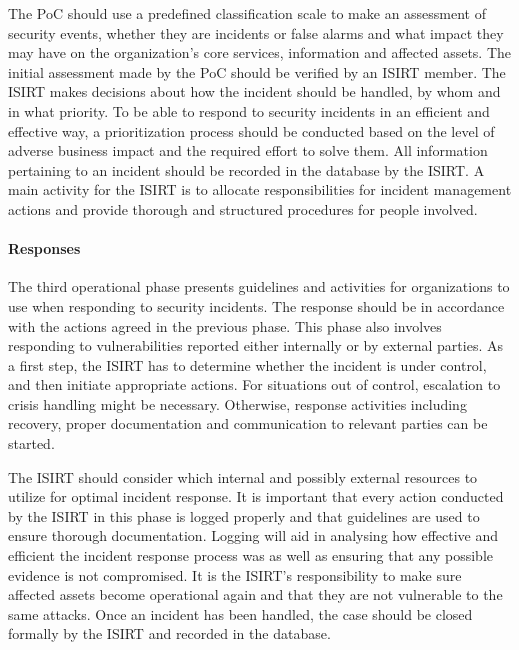 The PoC should use a predefined classification scale to make an assessment of security events, whether they are incidents or false alarms and what impact they may have on the organization's core services, information and affected assets. The initial assessment made by the PoC should be verified by an \ac{ISIRT} member. The \ac{ISIRT} makes decisions about how the incident should be handled, by whom and in what priority. To be able to respond to security incidents in an efficient and effective way, a prioritization process should be conducted based on the level of adverse business impact and the required effort to solve them.  All information pertaining to an incident should be recorded in the database by the \ac{ISIRT}. A main activity for the \ac{ISIRT} is to allocate responsibilities for incident management actions and provide thorough and structured procedures for people involved. 

\paragraph{Responses} The third operational phase presents guidelines and activities for organizations to use when responding to security incidents. The response should be in accordance with the actions agreed in the previous phase. This phase also involves responding to vulnerabilities reported either internally or by external parties. As a first step, the \ac{ISIRT} has to determine whether the incident is under control, and then initiate appropriate actions. For situations out of control, escalation to crisis handling might be necessary. Otherwise, response activities including recovery, proper documentation and communication to relevant parties can be started. 

The \ac{ISIRT} should consider which internal and possibly external resources to utilize for optimal incident response. It is important that every action conducted by the \ac{ISIRT} in this phase is logged properly and that guidelines are used to ensure thorough documentation. Logging will aid in analysing how effective and efficient the incident response process was as well as ensuring that any possible evidence is not compromised. It is the \ac{ISIRT}'s responsibility to make sure affected assets become operational again and that they are not vulnerable to the same attacks. Once an incident has been handled, the case should be closed formally by the \ac{ISIRT} and recorded in the database.

